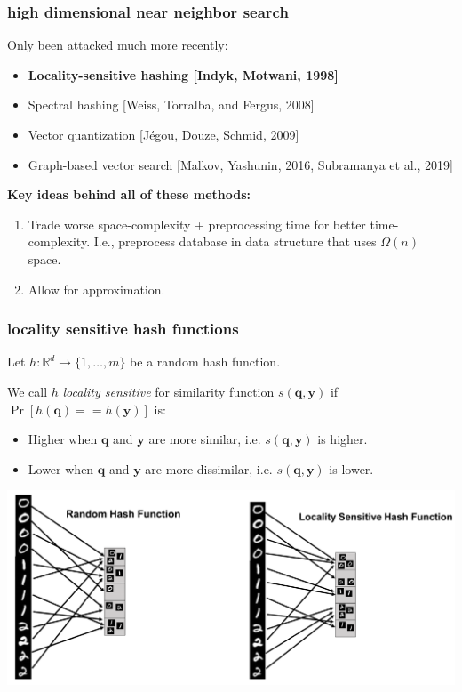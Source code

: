 \documentclass[compress]{beamer}
\newcommand{\bv}[1]{\mathbf{#1}}
\newcommand{\R}{\mathbb{R}}
\begin{document}
\begin{frame}
	\frametitle{high dimensional near neighbor search}	
	Only been attacked much more recently:
	\begin{itemize}
		\item \textbf{\alert{Locality-sensitive hashing [Indyk, Motwani, 1998]}}
		\item Spectral hashing [Weiss, Torralba, and Fergus, 2008]
		\item Vector quantization [J\'{e}gou, Douze, Schmid, 2009]
		\item Graph-based vector search [Malkov, Yashunin, 2016, Subramanya et al., 2019]
	\end{itemize}

\textbf{Key ideas behind all of these methods:} 
\begin{enumerate}
\item Trade worse space-complexity + preprocessing time for better time-complexity. I.e., preprocess database in data structure that uses $\Omega(n)$ space.
\item Allow for approximation.
\end{enumerate}
\end{frame}

\begin{frame}
	\frametitle{locality sensitive hash functions}
	Let $h: \R^d \rightarrow \{1, \ldots, m\}$ be a random hash function. 
	
	We call $h$ \emph{locality sensitive} for similarity function $s(\bv{q},\bv{y})$ if $\Pr\left[h(\bv{q}) == h(\bv{y})\right]$ is:
	\begin{itemize}
		\item Higher when $\bv{q}$ and $\bv{y}$ are more similar, i.e. $s(\bv{q},\bv{y})$ is higher.
		\item Lower when $\bv{q}$ and $\bv{y}$ are more dissimilar, i.e. $s(\bv{q},\bv{y})$ is lower. 
	\end{itemize}
\begin{center}
	\includegraphics[width=.9\textwidth]{cam_lsh.png}
\end{center}
\end{frame}
\end{document}
